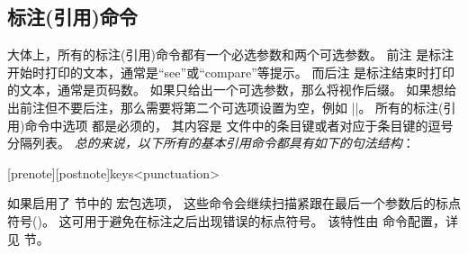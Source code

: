 \subsection{标注(引用)命令}%
\label{use:cit}


大体上，所有的标注(引用)命令都有一个必选参数和两个可选参数。
前注  是标注开始时打印的文本，通常是“see”或“compare”等提示。
而后注  是标注结束时打印的文本，通常是页码数。
如果只给出一个可选参数，那么将视作后缀。
如果想给出前注但不要后注，那么需要将第二个可选项设置为空，例如 |\cite[see][]{key}|。
所有的标注(引用)命令中选项  都是必须的，
其内容是  文件中的条目键或者对应于条目键的逗号分隔列表。
\emph{总的来说，以下所有的基本引用命令都具有如下的句法结构}：

\begin{ltxsyntax}

[prenote][postnote]{keys}<punctuation>

如果启用了  节中的  宏包选项，
这些命令会继续扫描紧跟在最后一个参数后的标点符号()。
这可用于避免在标注之后出现错误的标点符号。
该特性由  命令配置，详见  节。

\end{ltxsyntax}

